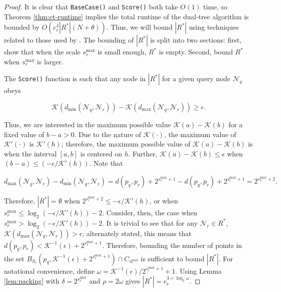 \begin{proof}
It is clear that \texttt{BaseCase()} and \texttt{Score()} both take $O(1)$ time,
so Theorem \ref{thm:ct-runtime} implies the total runtime of the dual-tree
algorithm is bounded by $O(c_r^4 |R^*| (N + \theta))$.  Thus, we will bound
$|R^*|$ using techniques related to those used by \citet{ram2009}.  The bounding
of $|R^*|$ is split into two sections: first, show that when the scale
$s_r^{\max}$ is small enough, $R^*$ is empty.  Second, bound $R^*$ when
$s_r^{\max}$ is larger.

The \texttt{Score()} function is such that any node in $|R^*|$ for a given query
node $\mathscr{N}_q$ obeys

\begin{equation}
\mathcal{K}(d_{\min}(\mathscr{N}_q, \mathscr{N}_r)) -
\mathcal{K}(d_{\max}(\mathscr{N}_q, \mathscr{N}_r))
\ge \epsilon.
\end{equation}

Thus, we are interested in the maximum possible value $\mathcal{K}(a) -
\mathcal{K}(b)$ for a fixed value of $b - a > 0$.  Due to the nature of
$\mathcal{K}(\cdot)$, the maximum value of $\mathcal{K}'(\cdot)$ is
$\mathcal{K}'(h)$; therefore, the maximum possible value of $\mathcal{K}(a) -
\mathcal{K}(b)$ is when the interval $[a, b]$ is centered on $h$.  Further,
$\mathcal{K}(a) - \mathcal{K}(b) \le \epsilon$ when $(b - a) \le (-\epsilon /
\mathcal{K}'(h))$.  Note that

\begin{equation}
d_{\max}(\mathscr{N}_q, \mathscr{N}_r) - d_{\min}(\mathscr{N}_q, \mathscr{N}_r)
= d(p_q, p_r) + 2^{s_r^{\max} + 1} - d(p_q, p_r) + 2^{s_r^{\max} + 1} = 2^{s_r^{\max} + 2}.
\end{equation}

Therefore, $|R^*| = \emptyset$ when
$2^{s_r^{\max} + 2} \le -\epsilon / \mathcal{K}'(h)$, or when
$s_r^{\max} \le \log_2( -\epsilon / \mathcal{K}'(h) ) - 2$.
%
Consider, then, the case when $s_r^{\max} > \log_2( -\epsilon /
\mathcal{K}'(h) ) - 2$.  It is trivial to see that for any $\mathscr{N}_r \in
R^*$, $\mathcal{K}(d_{\max}(\mathscr{N}_q, \mathscr{N}_r)) > \epsilon$;
alternately stated, this means that
$d(p_q, p_r) < \mathcal{K}^{-1}(\epsilon) + 2^{s_r^{\max} + 1}$.
Therefore, bounding the number of points in the set
$B_{S_r}(p_q, \mathcal{K}^{-1}(\epsilon) + 2^{s_r^{\max} + 1}) \cap
C_{s_r^{\max}}$
is sufficient to bound $|R^*|$.  For notational convenience, define $\omega = \mathcal{K}^{-1}(\epsilon) /
2^{s_r^{\max} + 1} + 1$.  Using Lemma \ref{lem:packing} with $\delta =
2^{s_r^{\max}}$ and $\rho = 2 \omega$ gives $|R^*| = c_r^{3 + \log_2 \omega}$.


\end{proof}

